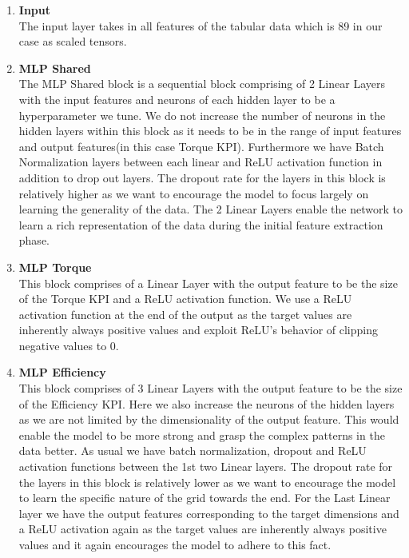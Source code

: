 \documentclass{report} %
\begin{document}
\begin{enumerate}
    \item \textbf{Input} \\
    The input layer takes in all features of the tabular data which is 89 in our case as scaled tensors.
    \item \textbf{MLP Shared} \\
    The MLP Shared block is a sequential block comprising of 2 Linear Layers with the input features and neurons of each hidden layer to be a hyperparameter we tune.
    We do not increase the number of neurons in the hidden layers within this block as it needs to be in the range of input features and output features(in this case Torque \ac{KPI}).
    Furthermore we have Batch Normalization layers between each linear and \ac{ReLU} activation function in addition to drop out layers.
    The dropout rate for the layers in this block is relatively higher as we want to encourage the model to focus largely on learning the generality of the data.
    The 2 Linear Layers enable the network to learn a rich representation of the data during the initial feature extraction phase.
    \item \textbf{MLP Torque} \\
    This block comprises of a Linear Layer with the output feature to be the size of the Torque \ac{KPI} and a \ac{ReLU} activation function.
    We use a \ac{ReLU} activation function at the end of the output as the target values are inherently always positive values and exploit \ac{ReLU}'s behavior of clipping negative values to 0.
    \item \textbf{MLP Efficiency} \\
    This block comprises of 3 Linear Layers with the output feature to be the size of the Efficiency \ac{KPI}.
    Here we also increase the neurons of the hidden layers as we are not limited by the dimensionality of the output feature.
    This would enable the model to be more strong and grasp the complex patterns in the data better.
    As usual we have batch normalization, dropout and \ac{ReLU} activation functions between the 1st two Linear layers.
    The dropout rate for the layers in this block is relatively lower as we want to encourage the model to learn the specific nature of the grid towards the end.
    For the Last Linear layer we have the output features corresponding to the target dimensions and a \ac{ReLU} activation again as the target values are inherently 
    always positive values and it again encourages the model to adhere to this fact.

\end{enumerate}
\end{document}
